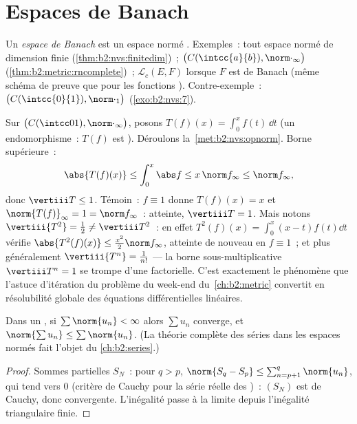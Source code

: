 \section{Espaces de Banach}

\begin{definition}\label{def:b2:nvs:banach}
Un \emph{espace de Banach} est un espace normé
. Exemples~: tout espace normé de dimension finie
(\cref{thm:b2:nvs:finitedim})~; $\bigl(C(\intcc{a}{b}),
\norm\cdot_\infty\bigr)$ (\cref{thm:b2:metric:rncomplete})~;
$\mathcal{L}_c(E, F)$ lorsque $F$ est de Banach (même schéma de preuve
que pour les fonctions ). Contre-exemple~: $\bigl(C(\intcc{0}{1}),
\norm\cdot_1\bigr)$ (\cref{exo:b2:nvs:7}).
\end{definition}

\begin{example}\label{ex:b2:nvs:integrationnorm}
Sur $\bigl(C(\intcc01), \norm\cdot_\infty\bigr)$, posons $T(f)(x) =
\int_0^x f(t)\,\dd t$ (un endomorphisme~: $T(f)$ est ).
Déroulons la~\cref{met:b2:nvs:opnorm}. Borne supérieure~:
\[
\abs{T(f)(x)} \leq \int_0^x\abs f \leq x\,\norm f_\infty \leq
\norm f_\infty ,
\]
donc $\vertiii T \leq 1$. Témoin~: $f \equiv 1$ donne $T(f)(x) =
x$ et $\norm{T(f)}_\infty = 1 = \norm f_\infty$~: atteinte,
$\vertiii T = 1$. Mais notons $\vertiii{T^2} = \frac12 \neq
\vertiii T^2$~: en effet $T^2(f)(x) = \int_0^x(x - t)f(t)\dd t$ vérifie
$\abs{T^2(f)(x)} \leq \frac{x^2}2\norm f_\infty$, atteinte de nouveau
en $f \equiv 1$~; et plus généralement $\vertiii{T^n} = \frac1{n!}$ ---
la borne sous-multiplicative $\vertiii T^n = 1$ se trompe d'une
factorielle. C'est exactement le phénomène que l'astuce d'itération du
problème du week-end du~\cref{ch:b2:metric} convertit en résolubilité
globale des équations différentielles linéaires.
\end{example}

\begin{theorem}\label{thm:b2:nvs:absoluteconvergence}
Dans un , si $\sum \norm{u_n} < \infty$ alors $\sum u_n$
converge, et $\norm{\sum u_n} \leq \sum\norm{u_n}$. (La théorie
complète des séries dans les espaces normés fait l'objet du
\cref{ch:b2:series}.)
\end{theorem}

\begin{proof}
Sommes partielles $S_N$~: pour $q > p$, $\norm{S_q - S_p} \leq
\sum_{n=p+1}^{q}\norm{u_n}$, qui tend vers $0$ (critère de Cauchy
pour la série réelle des )~: $(S_N)$ est de Cauchy, donc
convergente. L'inégalité passe à la limite depuis l'inégalité
triangulaire finie.
\end{proof}

